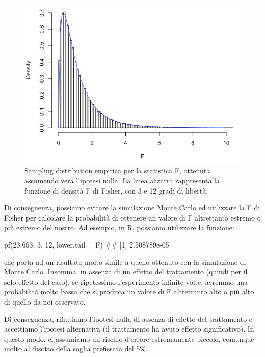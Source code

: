 \documentclass[a4paper,12pt,oneside]{book}
\newenvironment{Shaded}{\begin{snugshade}}{\end{snugshade}}
\newcommand{\DecValTok}[1]{#1}
\newcommand{\FloatTok}[1]{#1}
\newcommand{\DocumentationTok}[1]{#1}
\newcommand{\FunctionTok}[1]{#1}
\newcommand{\AttributeTok}[1]{#1}
\newcommand{\NormalTok}[1]{#1}
\begin{document}
\begin{figure}

{\centering \includegraphics[width=0.85\linewidth]{_images/SamplingDistribF} 

}

\caption{Sampling distribution empirica per la statistica F, ottenuta assumendo vera l'ipotesi nulla. La linea azzurra rappresenta la funzione di densità F di Fisher, con 3 e 12 gradi di libertà.}\label{fig:figName91}
\end{figure}

Di conseguenza, possiamo evitare la simulazione Monte Carlo ed utilizzare la F di Fisher per calcolare la probabilità di ottenere un valore di F altrettanto estremo o più estremo del nostro. Ad esempio, in R, possiamo utilizzare la funzione:

\begin{Shaded}
\begin{Highlighting}[]
\FunctionTok{pf}\NormalTok{(}\FloatTok{23.663}\NormalTok{, }\DecValTok{3}\NormalTok{, }\DecValTok{12}\NormalTok{, }\AttributeTok{lower.tail =}\NormalTok{ F)}
\DocumentationTok{\#\# [1] 2.508789e{-}05}
\end{Highlighting}
\end{Shaded}

che porta ad un risultato molto simile a quello ottenuto con la simulazione di Monte Carlo. Insomma, in assenza di un effetto del trattamento (quindi per il solo effetto del caso), se ripetessimo l'esperimento infinite volte, avremmo una probabilità molto bassa che si produca un valore di F altrettanto alto o più alto di quello da noi osservato.

Di conseguenza, rifiutiamo l'ipotesi nulla di assenza di effetto del trattamento e accettiamo l'ipotesi alternativa (il trattamento ha avuto effetto significativo). In questo modo, ci assumiamo un rischio d'errore estremamente piccolo, comunque molto al disotto della soglia prefissata del 5\%.
\end{document}

